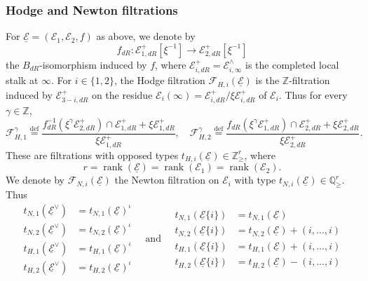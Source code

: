 \documentclass[11pt]{article}
\theoremstyle{definition}
\numberwithin{equation}{section}
\numberwithin{figure}{section}
\numberwithin{table}{section}
\DeclareMathOperator{\rank}{rank}
\newcommand{\eqd}{\stackrel{\mathrm{def}}{=}}
\newcommand*{\dR}{dR}
\begin{document}
\subsubsection{Hodge and Newton filtrations}\label{subsec:Hodge-and-NewtonForModif}

For $\underline{\mathcal{E}}=(\mathcal{E}_{1},\mathcal{E}_{2},f)$ as above, we denote by
\[
f_{\dR}:\mathcal{E}_{1,\dR}^{+}[\xi^{-1}]\rightarrow\mathcal{E}_{2,\dR}^{+}[\xi^{-1}]
\]
the $B_{\dR}$-isomorphism induced by $f$, where $\mathcal{E}_{i,\dR}^{+}=\mathcal{E}_{i,\infty}^{\wedge}$ is the completed local stalk at $\infty$. For $i\in\{1,2\}$, the Hodge filtration $\mathcal{F}_{H,i}(\underline{\mathcal{E}})$ is the $\mathbb{Z}$-filtration induced by $\mathcal{E}_{3-i,\dR}^{+}$ on the residue $\mathcal{E}_{i}(\infty)=\mathcal{E}_{i,\dR}^{+}/\xi\mathcal{E}_{i,\dR}^{+}$ of $\mathcal{E}_{i}$. Thus for every $\gamma\in\mathbb{Z}$,
\[
\mathcal{F}_{H,1}^{\gamma}\eqd\frac{f_{\dR}^{-1}(\xi^{\gamma}\mathcal{E}_{2,\dR}^{+})\cap\mathcal{E}_{1,\dR}^{+}+\xi\mathcal{E}_{1,\dR}^{+}}{\xi\mathcal{E}_{1,\dR}^{+}},\quad\mathcal{F}_{H,2}^{\gamma}\eqd\frac{f_{\dR}(\xi^{\gamma}\mathcal{E}_{1,\dR}^{+})\cap\mathcal{E}_{2,\dR}^{+}+\xi\mathcal{E}_{2,\dR}^{+}}{\xi\mathcal{E}_{2,\dR}^{+}}.
\]
These are filtrations with opposed types $t_{H,i}(\underline{\mathcal{E}})\in\mathbb{\mathbb{Z}}_{\geq}^{r}$, where
\[
r=\rank(\underline{\mathcal{E}})=\rank(\mathcal{E}_{1})=\rank(\mathcal{E}_{2}).
\]
We denote by $\mathcal{F}_{N,i}(\underline{\mathcal{E}})$ the Newton filtration on $\mathcal{E}_{i}$ with type $t_{N,i}(\mathcal{\underline{E}})\in\mathbb{Q}_{\geq}^{r}$. Thus
\[
\begin{aligned}
t_{N,1}\left(\underline{\mathcal{E}}^{\vee}\right) & = t_{N,1}\left(\underline{\mathcal{E}}\right)^{\iota}\\
t_{N,2}\left(\underline{\mathcal{E}}^{\vee}\right) & = t_{N,2}\left(\underline{\mathcal{E}}\right)^{\iota}\\
t_{H,1}\left(\underline{\mathcal{E}}^{\vee}\right) & = t_{H,1}\left(\underline{\mathcal{E}}\right)^{\iota}\\
t_{H,2}\left(\underline{\mathcal{E}}^{\vee}\right) & = t_{H,2}\left(\underline{\mathcal{E}}\right)^{\iota}
\end{aligned}\quad\text{and}\quad
\begin{aligned}
t_{N,1}\left(\underline{\mathcal{E}}\{i\}\right) & = t_{N,1}\left(\underline{\mathcal{E}}\right)\\
t_{N,2}\left(\underline{\mathcal{E}}\{i\}\right) & = t_{N,2}\left(\underline{\mathcal{E}}\right)+(i,\dots,i)\\
t_{H,1}\left(\underline{\mathcal{E}}\{i\}\right) & = t_{H,1}\left(\underline{\mathcal{E}}\right)+(i,\dots,i)\\
t_{H,2}\left(\underline{\mathcal{E}}\{i\}\right) & = t_{H,2}\left(\underline{\mathcal{E}}\right)-(i,\dots,i)
\end{aligned}
\]
\end{document}
